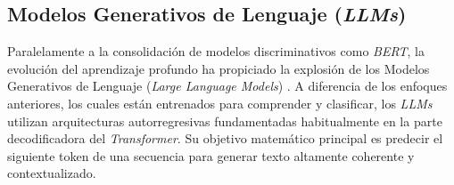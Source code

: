 \subsection{Modelos Generativos de Lenguaje (\textit{LLMs})}
\label{sec:LLMs}
Paralelamente a la consolidación de modelos discriminativos como \textit{BERT}, la evolución del aprendizaje profundo ha propiciado la explosión de los Modelos Generativos de Lenguaje (\textit{Large Language Models}) \cite{zhao2023survey}. A diferencia de los enfoques anteriores, los cuales están entrenados para comprender y clasificar, los \textit{LLMs} utilizan arquitecturas autorregresivas fundamentadas habitualmente en la parte decodificadora del \textit{Transformer}. Su objetivo matemático principal es predecir el siguiente token de una secuencia para generar texto altamente coherente y contextualizado.

